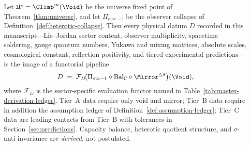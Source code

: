 \begin{theorem}\label{thm:master-derivation}
Let $\mathfrak{U}^\star=\Climb^\infty(\Void)$ be the universe fixed point of
Theorem~\ref{thm:universe}, and let $\Pi_{\sigma=-1}$ be the observer
collapse of Definition~\ref{def:heterotic-collapse}. Then every physical datum
$D$ recorded in this manuscript---Lie--Jordan sector content, observer
multiplicity, spacetime soldering, gauge quantum numbers, Yukawa and mixing
matrices, absolute scales, cosmological constant, reflection positivity, and
tiered experimental predictions---is the image of a functorial pipeline
\begin{equation}\label{eq:master-pipeline}
  D
  \;=\;
  \mathcal{F}_D\!\bigl(
    \Pi_{\sigma=-1}\circ\mathrm{Bal}_{\mathcal{C}}\circ\Mirror^{\leq 8}
  \bigr)(\Void),
\end{equation}
where $\mathcal{F}_D$ is the sector-specific evaluation functor named in
Table~\ref{tab:master-derivation-ledger}. Tier~A data require only void and
mirror; Tier~B data require in addition the assumption ledger of
Definition~\ref{def:assumption-ledger}; Tier~C data are leading contacts from
Tier~B with tolerances in Section~\ref{sec:predictions}. Capacity balance,
heterotic quotient structure, and $\sigma$-anti-invariance are \emph{derived},
not postulated.
\end{theorem}

